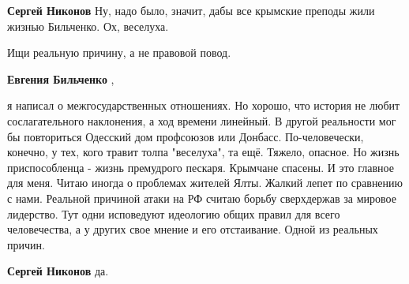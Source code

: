 \begin{itemize}
\begin{itemize}
 
\textbf{Сергей Никонов} Ну, надо было, значит, дабы все крымские преподы жили жизнью Бильченко. Ох, веселуха.

 
Ищи реальную причину, а не правовой повод.

 
\textbf{Евгения Бильченко} , 

я написал о межгосударственных отношениях. Но хорошо, что история не любит
сослагательного наклонения, а ход времени линейный. В другой реальности мог бы
повториться Одесский дом профсоюзов или Донбасс. По-человечески, конечно, у
тех, кого травит толпа "веселуха", та ещё. Тяжело, опасное. Но жизнь
приспособленца - жизнь премудрого пескаря. Крымчане спасены. И это главное для
меня. Читаю иногда о проблемах жителей Ялты. Жалкий лепет по сравнению с нами.
Реальной причиной атаки на РФ считаю борьбу сверхдержав за мировое лидерство.
Тут одни исповедуют идеологию общих правил для всего человечества, а у других
свое мнение и его отстаивание. Одной из реальных причин.


 
\textbf{Сергей Никонов} да.
\end{itemize}

 

\end{itemize}
